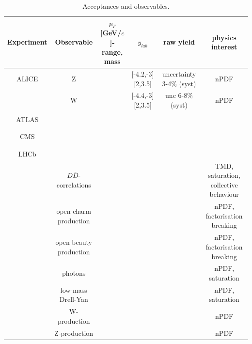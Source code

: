 \documentclass[../report.tex]{subfiles}
\begin{document}
\begin{table}[htbp]
 {\footnotesize
\centering
\begin{tabular}{|c|c|c|c|c|c|}
\hline
Experiment   & Observable & $p_{T}$[GeV/$c$]-range, mass & $y_{lab}$               & raw yield & physics interest \\
\hline
ALICE  & Z                &          & [-4.2,-3] [2,3.5] & uncertainty 3-4\%  (syst)  & nPDF       \\
       & W                &          & [-4.4,-3] [2,3.5] & unc 6-8\% (syst) & nPDF
\\
       &                  &          &        &                    &
\\
\hline
ATLAS  &                  &          &        &                     &        \\
       &                  &          &        &                    &
\\
       &                  &          &        &                    &
\\
\hline
CMS    &                  &          &        &                    &         \\
       &                  &          &        &                    &
\\
       &                  &          &        &                    &
\\
\hline
LHCb   &                  &          &         &                    &         \\

       &  $D\bar{D}$-correlations     &          &        &                    & TMD, saturation, collective behaviour  \\
       &  open-charm production     &          &        &                    & nPDF, factorisation breaking \\
 &  open-beauty production     &          &        &                    & nPDF, factorisation breaking \\
&  photons     &          &        &                    & nPDF, saturation \\
&  low-mass Drell-Yan   &          &        &                    & nPDF, saturation
\\
&  W-production     &          &        &                    & nPDF \\
&  Z-production     &          &        &                    & nPDF
\\
\hline
\end{tabular}
\caption{Acceptances and observables.  }
}
\end{table}
\end{document}
